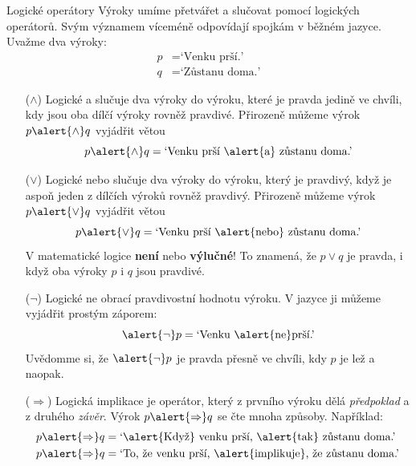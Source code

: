 \documentclass[final]{beamer}
\newlength{\colwidth}
\begin{document}
\begin{frame}[t]
\begin{columns}[t]
\begin{column}{\colwidth}
      \begin{exampleblock}{Logické operátory}
        Výroky umíme přetvářet a slučovat pomocí \alert{logických operátorů}.
        Svým významem víceméně odpovídají spojkám v běžném jazyce. Uvažme dva
        výroky:
        \begin{align*}
          p &= \text{`Venku prší.'}\\
          q &= \text{`Zůstanu doma.'}
        \end{align*}
        \begin{itemize}[left=40pt]
          \item[($\wedge$)] Logické \alert{a} slučuje dva výroky do výroku,
            které je pravda jedině ve chvíli, kdy jsou oba dílčí výroky rovněž
            pravdivé. Přirozeně můžeme výrok $p \alert{ \wedge } q$ vyjádřit větou
            \[
              p \alert{ \wedge } q = \text{`Venku prší \alert{a} zůstanu doma.'}
            \]
          \item[($ \vee $)] Logické \alert{nebo} slučuje dva výroky do výroku,
            který je pravdivý, když je aspoň jeden z dílčích výroků rovněž
            pravdivý. Přirozeně můžeme výrok $p \alert{ \vee } q$ vyjádřit větou
            \[
              p \alert{ \vee } q = \text{`Venku prší \alert{nebo} zůstanu
              doma.'}
            \]
            V matematické logice \textbf{není} \alert{nebo} \textbf{výlučné}! To
            znamená, že $p \vee q$ je pravda, i když oba výroky $p$ i $q$ jsou
            pravdivé.
          \item[($\neg $)] 
            Logické \alert{ne} obrací pravdivostní hodnotu výroku. V jazyce ji
            můžeme vyjádřit prostým záporem:
            \[
              \alert{\neg }p = \text{`Venku \alert{ne}prší.'}
            \]
            Uvědomme si, že $\alert{\neg }p$ je \alert{pravda} přesně ve chvíli,
            kdy $p$ je \alert{lež} a naopak.
          \item[($ \Rightarrow $)] 
            Logická \alert{implikace} je operátor, který z prvního výroku dělá
            \emph{předpoklad} a z druhého \emph{závěr}. Výrok $p \alert{
            \Rightarrow } q$ se čte mnoha způsoby. Například:
            \begin{align*}
              p \alert{ \Rightarrow } q &= \text{`\alert{Když} venku prší,
              \alert{tak} zůstanu doma.'}\\
              p \alert{ \Rightarrow } q &= \text{`To, že venku prší,
              \alert{implikuje}, že zůstanu doma.'}\\

\end{align*}
\end{itemize}
\end{exampleblock}
\end{column}
\end{columns}
\end{frame}
\end{document}
